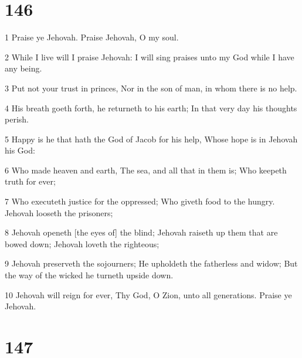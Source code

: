\chapter{146}

\par 1 Praise ye Jehovah. Praise Jehovah, O my soul.
\par 2 While I live will I praise Jehovah: I will sing praises unto my God while I have any being.
\par 3 Put not your trust in princes, Nor in the son of man, in whom there is no help.
\par 4 His breath goeth forth, he returneth to his earth; In that very day his thoughts perish.
\par 5 Happy is he that hath the God of Jacob for his help, Whose hope is in Jehovah his God:
\par 6 Who made heaven and earth, The sea, and all that in them is; Who keepeth truth for ever;
\par 7 Who executeth justice for the oppressed; Who giveth food to the hungry. Jehovah looseth the prisoners;
\par 8 Jehovah openeth [the eyes of] the blind; Jehovah raiseth up them that are bowed down; Jehovah loveth the righteous;
\par 9 Jehovah preserveth the sojourners; He upholdeth the fatherless and widow; But the way of the wicked he turneth upside down.
\par 10 Jehovah will reign for ever, Thy God, O Zion, unto all generations. Praise ye Jehovah.

\chapter{147}

